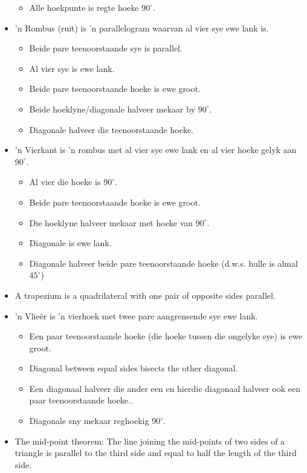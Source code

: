 \begin{itemize}[noitemsep]
\begin{itemize}
\item Alle hoekpunte is regte hoeke $90^{\circ}$.
\end{itemize}
\item ’n Rombus (ruit) is ’n parallelogram waarvan al vier sye ewe lank is.
\begin{itemize}
\item Beide pare teenoorstaande sye is parallel.
\item Al vier sye is ewe lank.
\item Beide pare teenoorstaande hoeke is ewe groot.
\item Beide hoeklyne/diagonale halveer mekaar by $90^\circ$.
\item Diagonale halveer die teenoorstaande hoeke.
\end{itemize}
\item ’n Vierkant is ’n rombus met al vier sye ewe lank en al vier hoeke gelyk aan $90^\circ$.
\begin{itemize}
\item Al vier die hoeke is $90^\circ$.
\item Beide pare teenoorstaande hoeke is ewe groot.
\item Die hoeklyne halveer mekaar met hoeke van $90^\circ$.
\item Diagonale is ewe lank.
\item Diagonale halveer beide pare teenoorstaande hoeke (d.w.s. hulle is almal $45^\circ$)
\end{itemize}
\item A trapezium is a quadrilateral with one pair of opposite sides parallel.
\item ’n Vlieër is ’n vierhoek met twee pare aangrensende sye ewe lank.
\begin{itemize}
\item Een paar teenoorstaande hoeke (die hoeke tussen die ongelyke sye) is ewe groot.
\item Diagonal between equal sides bisects the other diagonal.
\item Een diagonaal halveer die ander een en hierdie diagonaal halveer ook een paar teenoorstaande hoeke..
\item Diagonale sny mekaar reghoekig $90^\circ$.
\end{itemize}
\item The mid-point theorem: The line joining the mid-points of two sides of a triangle is parallel to the third side and equal to half the length of the third side.
\end{itemize}

